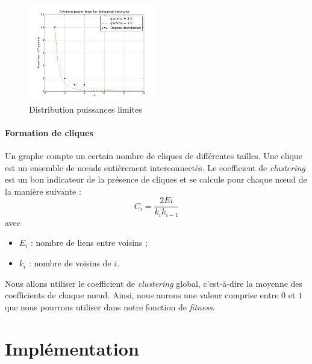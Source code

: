 \begin{figure}
  \vspace{-30pt}
  \begin{center}
    \includegraphics[width=0.50\textwidth]{Plot.png}
  \end{center}
  \caption{Distribution puissances limites}
  \label{scalefree}
\end{figure}
\paragraph*{Formation de cliques\\}

Un graphe compte un certain nombre de cliques de différentes tailles. Une clique est un ensemble de nœuds entièrement interconnectés. Le coefficient de \textit{clustering} est un bon indicateur de la présence de cliques et se calcule pour chaque nœud de la manière suivante :
$$ C_i = \frac{2Ei}{k_i k_{i-1}} $$
avec
\begin{itemize}
 \item $E_i$ : nombre de liens entre voisins ;
 \item $k_i$ : nombre de voisins de $i$.
\end{itemize}
Nous allons utiliser le coefficient de \textit{clustering} global, c'est-à-dire la moyenne des coefficients de chaque nœud. Ainsi, nous aurons une valeur comprise entre $0$ et $1$ que nous pourrons utiliser dans notre fonction de \textit{fitness}.


\section{Implémentation}

